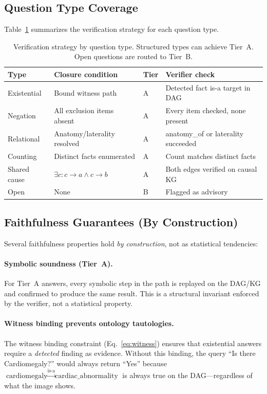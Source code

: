 \documentclass[runningheads]{llncs}
\begin{document}
\subsection{Question Type Coverage}

Table~\ref{tab:question_types} summarizes the verification strategy for
each question type.

\begin{table}[t]
\centering
\small
\caption{Verification strategy by question type. Structured types
  can achieve Tier~A.
  Open questions are routed to Tier~B.}
\label{tab:question_types}
\begin{tabular}{lllp{3.6cm}}
\toprule
\textbf{Type} & \textbf{Closure condition} & \textbf{Tier} &
  \textbf{Verifier check} \\
\midrule
Existential & Bound witness path & A &
  Detected fact is-a target in DAG \\
Negation & All exclusion items absent & A &
  Every item checked, none present \\
Relational & Anatomy/laterality resolved & A &
  anatomy\_of or laterality succeeded \\
Counting & Distinct facts enumerated & A &
  Count matches distinct facts \\
Shared cause & $\exists c: c \!\to\! a \wedge c \!\to\! b$ & A &
  Both edges verified on causal KG \\
Open & None & B &
  Flagged as advisory \\
\bottomrule
\end{tabular}
\end{table}

\subsection{Faithfulness Guarantees (By Construction)}
\label{sec:faithfulness_results}

Several faithfulness properties hold \emph{by construction}, not as
statistical tendencies:

\paragraph{Symbolic soundness (Tier~A).}
For Tier~A answers, every symbolic step in the path is replayed on the
DAG/KG and confirmed to produce the same result. This is a structural
invariant enforced by the verifier, not a statistical property.

\paragraph{Witness binding prevents ontology tautologies.}
The witness binding constraint (Eq.~\ref{eq:witness}) ensures that
existential answers require a \emph{detected} finding as evidence.
Without this binding, the query ``Is there Cardiomegaly?'' would always
return ``Yes'' because
$\text{cardiomegaly} \xrightarrow{\text{is-a}} \text{cardiac\_abnormality}$
is always true on the DAG---regardless of what the image shows.
\end{document}
